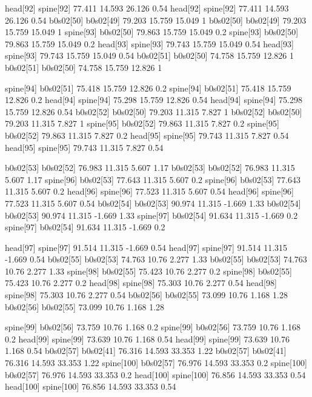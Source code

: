 head[92]    spine[92]    77.411    14.593    26.126    0.54
head[92]    spine[92]    77.411    14.593    26.126    0.54
b0s02[50]    b0s02[49]    79.203    15.759    15.049    1
b0s02[50]    b0s02[49]    79.203    15.759    15.049    1
spine[93]    b0s02[50]    79.863    15.759    15.049    0.2
spine[93]    b0s02[50]    79.863    15.759    15.049    0.2
head[93]    spine[93]    79.743    15.759    15.049    0.54
head[93]    spine[93]    79.743    15.759    15.049    0.54
b0s02[51]    b0s02[50]    74.758    15.759    12.826    1
b0s02[51]    b0s02[50]    74.758    15.759    12.826    1


spine[94]    b0s02[51]    75.418    15.759    12.826    0.2
spine[94]    b0s02[51]    75.418    15.759    12.826    0.2
head[94]    spine[94]    75.298    15.759    12.826    0.54
head[94]    spine[94]    75.298    15.759    12.826    0.54
b0s02[52]    b0s02[50]    79.203    11.315    7.827    1
b0s02[52]    b0s02[50]    79.203    11.315    7.827    1
spine[95]    b0s02[52]    79.863    11.315    7.827    0.2
spine[95]    b0s02[52]    79.863    11.315    7.827    0.2
head[95]    spine[95]    79.743    11.315    7.827    0.54
head[95]    spine[95]    79.743    11.315    7.827    0.54


b0s02[53]    b0s02[52]    76.983    11.315    5.607    1.17
b0s02[53]    b0s02[52]    76.983    11.315    5.607    1.17
spine[96]    b0s02[53]    77.643    11.315    5.607    0.2
spine[96]    b0s02[53]    77.643    11.315    5.607    0.2
head[96]    spine[96]    77.523    11.315    5.607    0.54
head[96]    spine[96]    77.523    11.315    5.607    0.54
b0s02[54]    b0s02[53]    90.974    11.315    -1.669    1.33
b0s02[54]    b0s02[53]    90.974    11.315    -1.669    1.33
spine[97]    b0s02[54]    91.634    11.315    -1.669    0.2
spine[97]    b0s02[54]    91.634    11.315    -1.669    0.2


head[97]    spine[97]    91.514    11.315    -1.669    0.54
head[97]    spine[97]    91.514    11.315    -1.669    0.54
b0s02[55]    b0s02[53]    74.763    10.76    2.277    1.33
b0s02[55]    b0s02[53]    74.763    10.76    2.277    1.33
spine[98]    b0s02[55]    75.423    10.76    2.277    0.2
spine[98]    b0s02[55]    75.423    10.76    2.277    0.2
head[98]    spine[98]    75.303    10.76    2.277    0.54
head[98]    spine[98]    75.303    10.76    2.277    0.54
b0s02[56]    b0s02[55]    73.099    10.76    1.168    1.28
b0s02[56]    b0s02[55]    73.099    10.76    1.168    1.28


spine[99]    b0s02[56]    73.759    10.76    1.168    0.2
spine[99]    b0s02[56]    73.759    10.76    1.168    0.2
head[99]    spine[99]    73.639    10.76    1.168    0.54
head[99]    spine[99]    73.639    10.76    1.168    0.54
b0s02[57]    b0s02[41]    76.316    14.593    33.353    1.22
b0s02[57]    b0s02[41]    76.316    14.593    33.353    1.22
spine[100]    b0s02[57]    76.976    14.593    33.353    0.2
spine[100]    b0s02[57]    76.976    14.593    33.353    0.2
head[100]    spine[100]    76.856    14.593    33.353    0.54
head[100]    spine[100]    76.856    14.593    33.353    0.54


